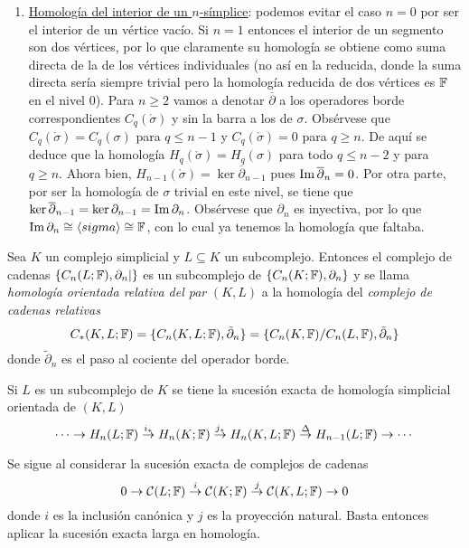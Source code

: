 \documentclass[HS.tex]{subfiles}
\begin{document}
\begin{ej}
\begin{enumerate}
\item \underline{Homología del interior de un $n$-símplice}: podemos evitar el caso $n=0$ por ser el interior de un vértice vacío. Si $n=1$ entonces el interior de un segmento son dos vértices, por lo que claramente su homología se obtiene como suma directa de la de los vértices individuales (no así en la reducida, donde la suma directa sería siempre trivial pero la homología reducida de dos vértices es $\mathbb{F}$ en el nivel 0). Para $n\geq 2$ vamos a denotar $\overline{\partial}$ a los operadores borde correspondientes $C_q(\mathring{\sigma})$ y sin la barra a los de $\sigma$. Obsérvese que $C_q(\mathring{\sigma})=C_q(\sigma)$ para $q\leq n-1$ y $C_q(\mathring{\sigma})=0$ para $q\geq n$. De aquí se deduce que la homología $H_q(\mathring{\sigma})=H_q(\sigma)$ para todo $q\leq n-2$ y para $q\geq n$. Ahora bien, $H_{n-1}(\mathring{\sigma})=\ker\overline{\partial}_{n-1}$ pues $\operatorname{Im}\overline{\partial}_n=0$. Por otra parte, por ser la homología de $\sigma$ trivial en este nivel, se tiene que $\ker\overline{\partial}_{n-1}=\ker\partial_{n-1}=\operatorname{Im}\partial_n$. Obsérvese que $\partial_n$ es inyectiva, por lo que $\operatorname{Im}\partial_n\cong \langle{sigma}\rangle\cong\mathbb{F}$, con lo cual ya tenemos la homología que faltaba. 
\end{enumerate}
\end{ej}

\begin{defi}
Sea $K$ un complejo simplicial y $L\subseteq K$ un subcomplejo. Entonces el complejo de cadenas $\{C_n(L;\mathbb{F}),\partial_n|\}$ es un subcomplejo de $\{C_n(K;\mathbb{F}),\partial_n\}$ y se llama \emph{homología orientada relativa del par} $(K,L)$ a la homología del \emph{complejo de cadenas relativas}
\[
C_*(K,L;\mathbb{F})=\{C_n(K,L;\mathbb{F}),\tilde{\partial}_n\}=\{C_n(K,\mathbb{F})/C_n(L,\mathbb{F}),\tilde{\partial}_n\}
\]
donde $\tilde{\partial}_n$ es el paso al cociente del operador borde. 
\end{defi}

\begin{prop}
Si $L$ es un subcomplejo de $K$ se tiene la sucesión exacta de homología simplicial orientada de $(K,L)$
\[
\cdots\to H_n(L;\mathbb{F})\overset{i_*}{\to} H_n(K;\mathbb{F})\overset{j_*}{\to} H_n(K,L;\mathbb{F})\overset{\Delta}{\to} H_{n-1}(L;\mathbb{F})\to\cdots
\]
\end{prop}
\begin{dem}
Se sigue al considerar la sucesión exacta de complejos de cadenas
\[
0\to \mathcal{C}(L;\mathbb{F})\overset{i}{\to} \mathcal{C}(K;\mathbb{F})\overset{j}{\to} \mathcal{C}(K,L;\mathbb{F})\to 0
\]
donde $i$ es la inclusión canónica y $j$ es la proyección natural. Basta entonces aplicar la sucesión exacta larga en homología.  \QED
\end{dem}
\end{document}
